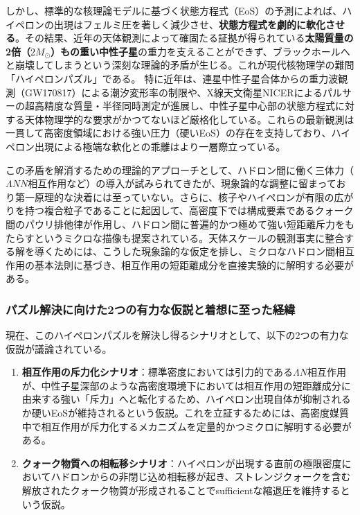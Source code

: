 \documentclass[11pt,a4j,dvipdfmx]{jarticle} 					%
\newcommand{\研究課題名}{加速器実験による短距離バリオン間相互作用の解明と中性子星ハイペロンパズルの解決}
\newcommand{\研究機関名}{東北大学}
\newcommand{\研究代表者氏名}{市川裕大}
\newcommand{\研究期間の最終元号年度}{13}
\begin{document}
しかし、標準的な核理論モデルに基づく状態方程式（EoS）の予測によれば、ハイペロンの出現はフェルミ圧を著しく減少させ、\textbf{状態方程式を劇的に軟化させる}。その結果、近年の天体観測によって確固たる証拠が得られている\textbf{太陽質量の2倍（$2M_\odot$）もの重い中性子星}の重力を支えることができず、ブラックホールへと崩壊してしまうという深刻な理論的矛盾が生じる。これが現代核物理学の難問「ハイペロンパズル」である。
特に近年は、連星中性子星合体からの重力波観測（GW170817）による潮汐変形率の制限や、X線天文衛星NICERによるパルサーの超高精度な質量・半径同時測定が進展し、中性子星中心部の状態方程式に対する天体物理学的な要求がかつてないほど厳格化している。これらの最新観測は一貫して高密度領域における強い圧力（硬いEoS）の存在を支持しており、ハイペロン出現による極端な軟化との乖離はより一層際立っている。

この矛盾を解消するための理論的アプローチとして、ハドロン間に働く三体力（$\Lambda NN$相互作用など）の導入が試みられてきたが、現象論的な調整に留まっており第一原理的な決着には至っていない。さらに、核子やハイペロンが有限の広がりを持つ複合粒子であることに起因して、高密度下では構成要素であるクォーク間のパウリ排他律が作用し、ハドロン間に普遍的かつ極めて強い短距離斥力をもたらすというミクロな描像も提案されている。天体スケールの観測事実に整合する解を導くためには、こうした現象論的な仮定を排し、ミクロなハドロン間相互作用の基本法則に基づき、相互作用の短距離成分を直接実験的に解明する必要がある。

\subsubsection{パズル解決に向けた2つの有力な仮説と着想に至った経緯}
現在、このハイペロンパズルを解決し得るシナリオとして、以下の2つの有力な仮説が議論されている。
\begin{enumerate}
    \item \textbf{相互作用の斥力化シナリオ}：標準密度においては引力的である$\Lambda N$相互作用が、中性子星深部のような高密度環境下においては相互作用の短距離成分に由来する強い「斥力」へと転化するため、ハイペロン出現自体が抑制されるか硬いEoSが維持されるという仮説。これを立証するためには、高密度媒質中で相互作用が斥力化するメカニズムを定量的かつミクロに解明する必要がある。
    \item \textbf{クォーク物質への相転移シナリオ}：ハイペロンが出現する直前の極限密度においてハドロンからの非閉じ込め相転移が起き、ストレンジクォークを含む解放されたクォーク物質が形成されることでsufficientな縮退圧を維持するという仮説。
\end{enumerate}
\end{document}
